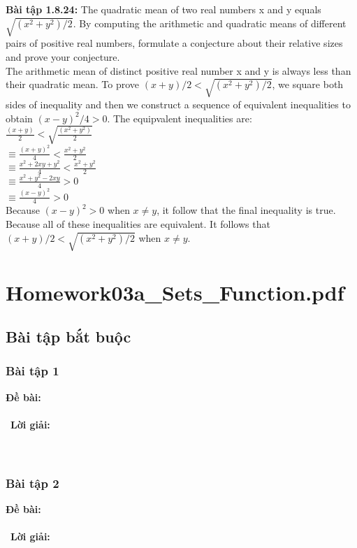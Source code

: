 \documentclass[a4paper]{article}
\begin{document}
\begin{enumerate}
\textbf{Bài tập 1.8.24:} The quadratic mean of two real numbers x and y equals $\sqrt{(x^{2} + y^{2})/2}$. By computing the arithmetic and quadratic means of different pairs of positive real numbers, formulate a conjecture about their relative sizes and prove your conjecture.\\
The arithmetic mean of distinct positive real number x and y is always less than their quadratic mean. To prove $(x + y)/2 < \sqrt{(x^{2} + y^{2})/2}$, we square both sides of inequality and then we construct a sequence of equivalent inequalities to obtain $(x-y)^{2}/4 > 0$. The equipvalent inequalities are:\\
$\frac{(x + y)}{2} < \sqrt{\frac{(x^{2} + y^{2})}{2}}$\\
$\equiv \frac{(x + y)^{2}}{4} < \frac{x^{2} + y^{2}}{2}$\\
$\equiv \frac{x^{2} + 2xy + y^{2}}{4} < \frac{x^{2} + y^{2}}{2}$\\
$\equiv \frac{x^{2} + y^{2} - 2xy}{4} > 0$\\
$\equiv \frac{(x - y)^{2}}{4} > 0$\\
Because $(x - y)^{2} > 0$ when $x \ne y$, it follow that the final inequality is true. Because all of these inequalities are equivalent. It follows that $(x + y)/2 < \sqrt{(x^{2} + y^{2})/2}$ when $x \ne y$.\\
\clearpage

\section{Homework03a\_Sets\_Function.pdf}
\subsection{Bài tập bắt buộc}
\subsubsection{Bài tập 1}
\textbf{Đề bài:} 
\\\ \\\
\textbf{Lời giải:} \\\ \\\
\clearpage
\subsubsection{Bài tập 2}
\textbf{Đề bài:} 
\\\ \\\
\textbf{Lời giải:} \\\ \\\
\clearpage

\end{enumerate}
\end{document}
